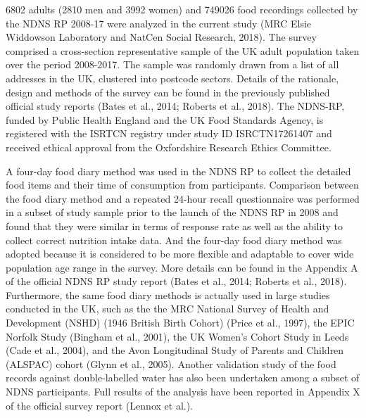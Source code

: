 \documentclass[utf8]{frontiersSCNS}
\begin{document}
6802 adults (2810 men and 3992 women) and 749026 food recordings
collected by the NDNS RP 2008-17 were analyzed in the current study (MRC
Elsie Widdowson Laboratory and NatCen Social Research, 2018). The survey
comprised a cross-section representative sample of the UK adult
population taken over the period 2008-2017. The sample was randomly
drawn from a list of all addresses in the UK, clustered into postcode
sectors. Details of the rationale, design and methods of the survey can
be found in the previously published official study reports (Bates et
al., 2014; Roberts et al., 2018). The NDNS-RP, funded by Public Health
England and the UK Food Standards Agency, is registered with the ISRTCN
registry under study ID ISRCTN17261407 and received ethical approval
from the Oxfordshire Research Ethics Committee.

A four-day food diary method was used in the NDNS RP to collect the
detailed food items and their time of consumption from participants.
Comparison between the food diary method and a repeated 24-hour recall
questionnaire was performed in a subset of study sample prior to the
launch of the NDNS RP in 2008 and found that they were similar in terms
of response rate as well as the ability to collect correct nutrition
intake data. And the four-day food diary method was adopted because it
is considered to be more flexible and adaptable to cover wide population
age range in the survey. More details can be found in the Appendix A of
the official NDNS RP study report (Bates et al., 2014; Roberts et al.,
2018). Furthermore, the same food diary methods is actually used in
large studies conducted in the UK, such as the the MRC National Survey
of Health and Development (NSHD) (1946 British Birth Cohort) (Price et
al., 1997), the EPIC Norfolk Study (Bingham et al., 2001), the UK
Women's Cohort Study in Leeds (Cade et al., 2004), and the Avon
Longitudinal Study of Parents and Children (ALSPAC) cohort (Glynn et
al., 2005). Another validation study of the food records against
double-labelled water has also been undertaken among a subset of NDNS
participants. Full results of the analysis have been reported in
Appendix X of the official survey report (Lennox et al.).
\end{document}
